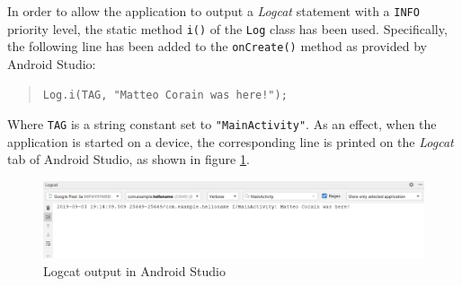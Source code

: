 \documentclass[letterpaper,headings=standardclasses]{scrartcl}
\begin{document}
In order to allow the application to output a \emph{Logcat} statement with a \texttt{INFO} priority level, the static method \texttt{i()} of the \texttt{Log} class has been used. Specifically, the following line has been added to the \texttt{onCreate()} method as provided by Android Studio:

\begin{quote}
\begin{verbatim}
Log.i(TAG, "Matteo Corain was here!");
\end{verbatim}
\end{quote}

Where \texttt{TAG} is a string constant set to \texttt{"MainActivity"}. As an effect, when the application is started on a device, the corresponding line is printed on the \emph{Logcat} tab of Android Studio, as shown in figure \ref{logcat}.

\begin{figure}[H]
  \centering
  \includegraphics[width=.9\linewidth]{04_logcat.png}
  \caption{Logcat output in Android Studio}
  \label{logcat}
\end{figure}
\end{document}
